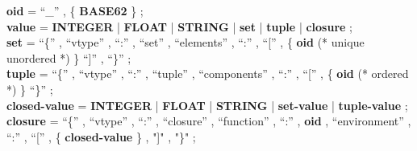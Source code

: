 \documentclass[11pt,a4paper,svgnames]{article}
\begin{document}
\textbf{oid} = ``\_'' , \{ \textbf{BASE62} \} ; \\
\textbf{value} = \textbf{INTEGER} | \textbf{FLOAT} | \textbf{STRING} 
	       | \textbf{set} | \textbf{tuple}  | \textbf{closure} ; \\
\textbf{set} = ``\{'' , ``vtype'' , ``:'' , ``set'' , 
             ``elements'' , ``:'' , 
	     ``['' , \{ \textbf{oid} (* unique unordered *) \} 
	     ``]'' ,  ``\}'' ; \\
\textbf{tuple} = ``\{'' , ``vtype'' , ``:'' , ``tuple'' , 
                   ``components'' , ``:'' ,  ``['' , \{ \textbf{oid} (* ordered *) \} 
		   ``\}'' ; \\
\textbf{closed-value} = \textbf{INTEGER} | \textbf{FLOAT} | \textbf{STRING}
                      | \textbf{set-value} | \textbf{tuple-value} ; \\
\textbf{closure} = ``\{'' , ``vtype'' , ``:'' , ``closure'' , 
	         ``function'' , ``:'' , \textbf{oid} , 
		 ``environment'' , ``:'' , ``['' , \{ \textbf{closed-value} \} , "]" , "\}" ;

\clearpage
\printnoidxglossaries
\bigskip
\printbibliography
\bigskip
\printindex
\end{document}
